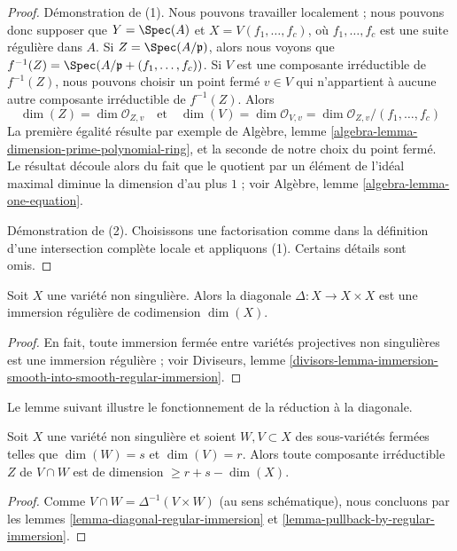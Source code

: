 \begin{proof}
Démonstration de (1). Nous pouvons travailler localement ; nous pouvons donc supposer que
$Y = \Spec(A)$ et $X = V(f_1, \ldots, f_c)$, où $f_1, \ldots, f_c$
est une suite régulière dans $A$. Si $Z = \Spec(A/\mathfrak p)$, alors
nous voyons que $f^{-1}(Z) = \Spec(A/\mathfrak p + (f_1, \ldots, f_c))$.
Si $V$ est une composante irréductible de $f^{-1}(Z)$, nous pouvons
choisir un point fermé $v \in V$ qui n'appartient à aucune autre composante irréductible
de $f^{-1}(Z)$. Alors
$$
\dim(Z) = \dim \mathcal{O}_{Z, v}
\quad\text{et}\quad
\dim(V) = \dim \mathcal{O}_{V, v} = \dim \mathcal{O}_{Z, v}/(f_1, \ldots, f_c)
$$
La première égalité résulte par exemple de
Algèbre, lemme \ref{algebra-lemma-dimension-prime-polynomial-ring},
et la seconde de notre choix du point fermé.
Le résultat découle alors du fait que le quotient par un élément
de l'idéal maximal diminue la dimension d'au plus $1$ ; voir
Algèbre, lemme \ref{algebra-lemma-one-equation}.

\medskip\noindent
Démonstration de (2). Choisissons une factorisation comme dans la définition d'une
intersection complète locale et appliquons (1). Certains détails sont omis.
\end{proof}

\begin{lemma}
\label{lemma-diagonal-regular-immersion}
Soit $X$ une variété non singulière. Alors la diagonale
$\Delta : X \to X \times X$ est une immersion régulière de codimension $\dim(X)$.
\end{lemma}

\begin{proof}
En fait, toute immersion fermée entre variétés projectives non singulières
est une immersion régulière ; voir Diviseurs,
lemme \ref{divisors-lemma-immersion-smooth-into-smooth-regular-immersion}.
\end{proof}

\noindent
Le lemme suivant illustre le fonctionnement de la réduction à la diagonale.

\begin{lemma}
\label{lemma-intersect-in-smooth}
Soit $X$ une variété non singulière et soient $W,V \subset X$
des sous-variétés fermées telles que $\dim(W) = s$ et $\dim(V) = r$. Alors toute
composante irréductible $Z$ de $V \cap W$ est de dimension $\geq r + s - \dim(X)$.
\end{lemma}

\begin{proof}
Comme $V \cap W = \Delta^{-1}(V \times W)$ (au sens schématique),
nous concluons par les lemmes \ref{lemma-diagonal-regular-immersion} et
\ref{lemma-pullback-by-regular-immersion}.
\end{proof}

